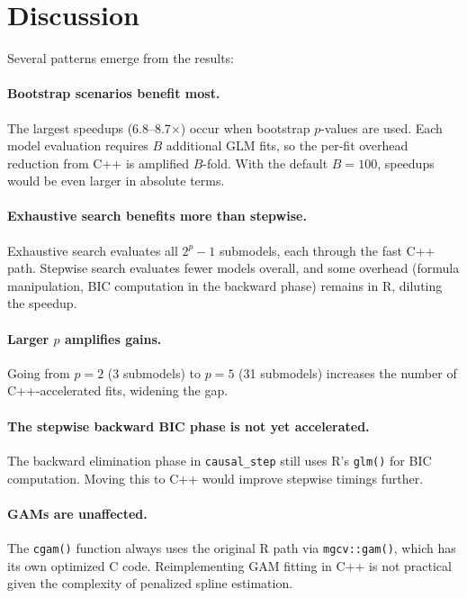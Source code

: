 \documentclass[11pt,a4paper]{article}
\begin{document}
\section{Discussion}

Several patterns emerge from the results:

\paragraph{Bootstrap scenarios benefit most.}
The largest speedups (6.8--8.7$\times$) occur when bootstrap $p$-values are
used.  Each model evaluation requires $B$ additional GLM fits, so the per-fit
overhead reduction from C++ is amplified $B$-fold.  With the default
$B = 100$, speedups would be even larger in absolute terms.

\paragraph{Exhaustive search benefits more than stepwise.}
Exhaustive search evaluates all $2^p - 1$ submodels, each through the fast C++
path.  Stepwise search evaluates fewer models overall, and some overhead
(formula manipulation, BIC computation in the backward phase) remains in R,
diluting the speedup.

\paragraph{Larger $p$ amplifies gains.}
Going from $p = 2$ (3 submodels) to $p = 5$ (31 submodels) increases the
number of C++-accelerated fits, widening the gap.

\paragraph{The stepwise backward BIC phase is not yet accelerated.}
The backward elimination phase in \texttt{causal\_step} still uses R's
\texttt{glm()} for BIC computation.  Moving this to C++ would improve
stepwise timings further.

\paragraph{GAMs are unaffected.}
The \texttt{cgam()} function always uses the original R path via
\texttt{mgcv::gam()}, which has its own optimized C code.  Reimplementing
GAM fitting in C++ is not practical given the complexity of penalized spline
estimation.
\end{document}
